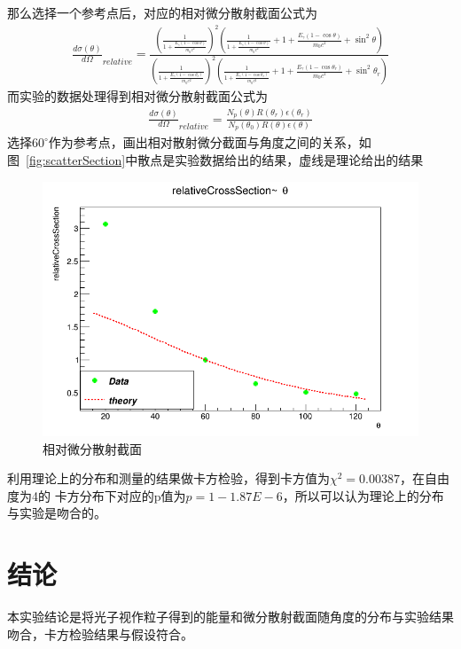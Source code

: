 \documentclass[10pt]{ctexart}
\begin{document}
那么选择一个参考点后，对应的相对微分散射截面公式为
\begin{align}
    \frac{d\sigma(\theta)}{d\Omega}_{relative}=\frac{(\frac{1}{1+\frac{E_\gamma(1-\cos{\theta})}{m_0c^2}})^2(\frac{1}{1+\frac{E_\gamma(1-\cos{\theta})}{m_0c^2}}+1+\frac{E_\gamma(1-\cos{\theta})}{m_0c^2}+\sin^2{\theta})}{(\frac{1}{1+\frac{E_\gamma(1-\cos{\theta_r})}{m_0c^2}})^2(\frac{1}{1+\frac{E_\gamma(1-\cos{\theta_r})}{m_0c^2}}+1+\frac{E_\gamma(1-\cos{\theta_r})}{m_0c^2}+\sin^2{\theta_r})}
    \label{equ:scatterSectionRelative}
\end{align}
而实验的数据处理得到相对微分散射截面公式为
\begin{align}
    \frac{d\sigma(\theta)}{d\Omega}_{relative}=\frac{N_p(\theta)R(\theta_r)\epsilon(\theta_r)}{N_p(\theta_0)R(\theta)\epsilon(\theta)}
    \label{equ:scatterSectionRelativeExp}
\end{align}
选择$60^\circ$作为参考点，画出相对散射微分截面与角度之间的关系，如图~\ref{fig:scatterSection}中散点是实验数据给出的结果，虚线是理论给出的结果
\begin{figure}[htbp]
    \centering
    \includegraphics[width=\textwidth]{data/scatterPBarn.png}
    \caption{相对微分散射截面}
    \label{fig:fit}
\end{figure}
利用理论上的分布和测量的结果做卡方检验，得到卡方值为$\chi^2=0.00387$，在自由度为4的
卡方分布下对应的p值为$p=1-1.87E-6$，所以可以认为理论上的分布与实验是吻合的。

\section{结论}
本实验结论是将光子视作粒子得到的能量和微分散射截面随角度的分布与实验结果吻合，卡方检验结果与假设符合。

\end{document}
